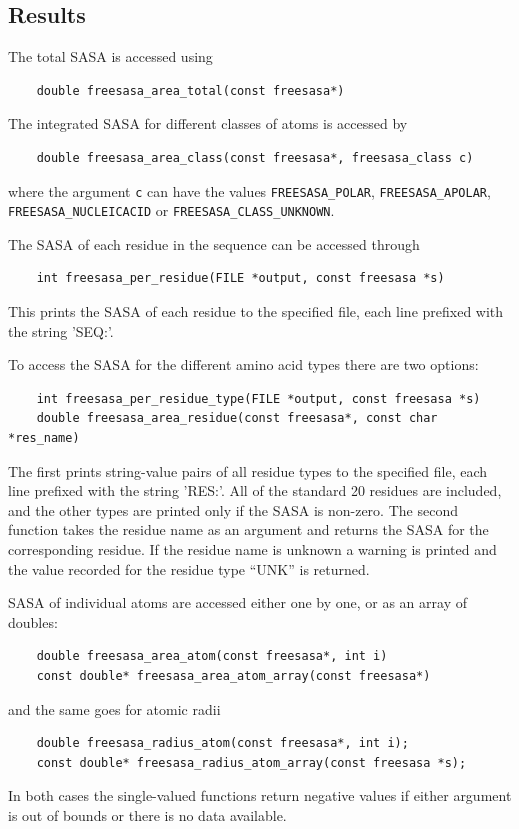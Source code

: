 \documentclass[a4paper,11pt]{article}
\begin{document}
\subsection{Results}

The total SASA is accessed using
\begin{verbatim}
    double freesasa_area_total(const freesasa*)
\end{verbatim}
The integrated SASA for different classes of atoms is accessed by
\begin{verbatim}
    double freesasa_area_class(const freesasa*, freesasa_class c)
\end{verbatim}
where the argument \verb|c| can have the values \verb|FREESASA_POLAR|, 
\verb|FREESASA_APOLAR|, \verb|FREESASA_NUCLEICACID| or 
\verb|FREESASA_CLASS_UNKNOWN|.

The SASA of each residue in the sequence can be accessed through
\begin{verbatim}
    int freesasa_per_residue(FILE *output, const freesasa *s)
\end{verbatim}
This prints the SASA of each residue to the specified file, each
line prefixed with the string 'SEQ:'.

To access the SASA for the different amino acid types there are two
options:
\begin{verbatim}
    int freesasa_per_residue_type(FILE *output, const freesasa *s)
    double freesasa_area_residue(const freesasa*, const char *res_name)
\end{verbatim}
The first prints string-value pairs of all residue types to the
specified file, each line prefixed with the string 'RES:'. All of the
standard 20 residues are included, and the other types are printed
only if the SASA is non-zero.  The second function takes the residue
name as an argument and returns the SASA for the corresponding
residue. If the residue name is unknown a warning is printed and the
value recorded for the residue type ``UNK'' is returned.

SASA of individual atoms are accessed either one by one, or
as an array of doubles:
\begin{verbatim}
    double freesasa_area_atom(const freesasa*, int i)
    const double* freesasa_area_atom_array(const freesasa*)
\end{verbatim}
and the same goes for atomic radii
\begin{verbatim}
    double freesasa_radius_atom(const freesasa*, int i);
    const double* freesasa_radius_atom_array(const freesasa *s);
\end{verbatim}
In both cases the single-valued functions return negative values if
either argument is out of bounds or there is no data available. 
\end{document}
